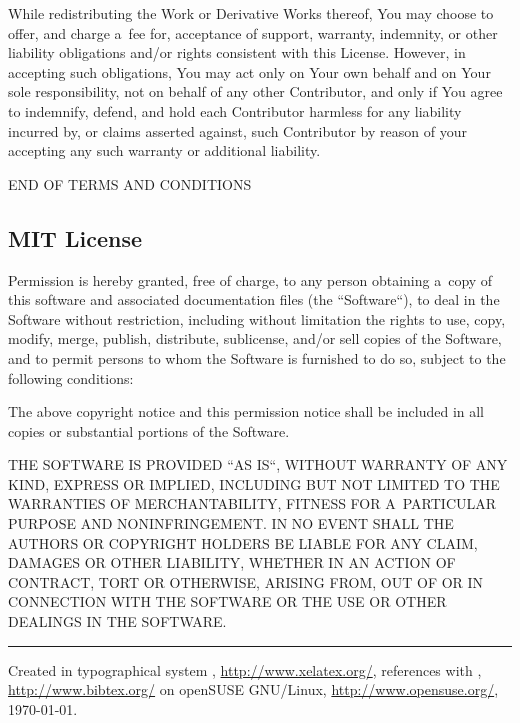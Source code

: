 \documentclass[a4paper, 11pt, twoside]{article}
\begin{document}
While redistributing the Work or Derivative Works thereof, You may choose to offer, and charge a~fee for, acceptance of support, warranty, indemnity, or other liability obligations and/or rights consistent with this License. However, in accepting such obligations, You may act only on Your own behalf and on Your sole responsibility, not on behalf of any other Contributor, and only if You agree to indemnify, defend, and hold each Contributor harmless for any liability incurred by, or claims asserted against, such Contributor by reason of your accepting any such warranty or additional liability.

END OF TERMS AND CONDITIONS

\subsection{MIT License}

Permission is hereby granted, free of charge, to any person obtaining a~copy of this software and associated documentation files (the “Software“), to deal in the Software without restriction, including without limitation the rights to use, copy, modify, merge, publish, distribute, sublicense, and/or sell copies of the Software, and to permit persons to whom the Software is furnished to do so, subject to the following conditions:

The above copyright notice and this permission notice shall be included in all copies or substantial portions of the Software.

THE SOFTWARE IS PROVIDED “AS IS“, WITHOUT WARRANTY OF ANY KIND, EXPRESS OR IMPLIED, INCLUDING BUT NOT LIMITED TO THE WARRANTIES OF MERCHANTABILITY, FITNESS FOR A~PARTICULAR PURPOSE AND NONINFRINGEMENT. IN NO EVENT SHALL THE AUTHORS OR COPYRIGHT HOLDERS BE LIABLE FOR ANY CLAIM, DAMAGES OR OTHER LIABILITY, WHETHER IN AN ACTION OF CONTRACT, TORT OR OTHERWISE, ARISING FROM, OUT OF OR IN CONNECTION WITH THE SOFTWARE OR THE USE OR OTHER DEALINGS IN THE SOFTWARE.

\endgroup



\vfill
\hrule
\vfill
\begin{tiny}
  Created in typographical system \XeLaTeX, \url{http://www.xelatex.org/}, references with \BibTeX, \url{http://www.bibtex.org/} on openSUSE GNU/Li\-nux, \url{http://www.opensuse.org/}, \today.
\end{tiny}
\end{document}
